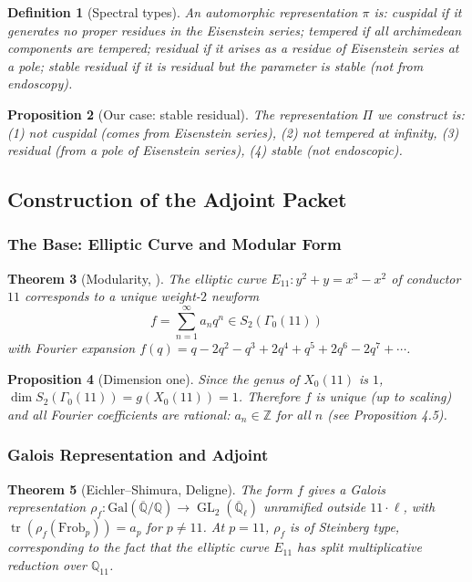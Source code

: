 \documentclass[12pt]{amsart}
\newtheorem{theorem}{Theorem}[section]
\newtheorem{proposition}[theorem]{Proposition}
\newtheorem{definition}[theorem]{Definition}
\theoremstyle{definition}
\DeclareMathOperator\GL{GL}
\DeclareMathOperator\tr{tr}
\newcommand{\Q}{\mathbb{Q}}
\newcommand{\Z}{\mathbb{Z}}
\newcommand{\Frob}{\mathrm{Frob}}
\newcommand{\Gal}{\mathrm{Gal}}
\begin{document}
\begin{definition}[Spectral types]
An automorphic representation $\pi$ is: \emph{cuspidal} if it generates no proper residues in the Eisenstein series; \emph{tempered} if all archimedean components are tempered; \emph{residual} if it arises as a residue of Eisenstein series at a pole; \emph{stable residual} if it is residual but the parameter is stable (not from endoscopy).
\end{definition}

\begin{proposition}[Our case: stable residual]
The representation $\Pi$ we construct is: (1) not cuspidal (comes from Eisenstein series), (2) not tempered at infinity, (3) residual (from a pole of Eisenstein series), (4) stable (not endoscopic).
\end{proposition}

\subsection{Construction of the Adjoint Packet}

\subsubsection{The Base: Elliptic Curve and Modular Form}

\begin{theorem}[Modularity, \cite{Wiles-Taylor}]
The elliptic curve $E_{11}: y^2 + y = x^3 - x^2$ of conductor $11$ corresponds to a unique weight-$2$ newform
\[
f = \sum_{n=1}^{\infty} a_n q^n \in S_2(\Gamma_0(11))
\]
with Fourier expansion $f(q) = q - 2q^2 - q^3 + 2q^4 + q^5 + 2q^6 - 2q^7 + \cdots$.
\end{theorem}

\begin{proposition}[Dimension one]
Since the genus of $X_0(11)$ is $1$, $\dim S_2(\Gamma_0(11)) = g(X_0(11)) = 1$. Therefore $f$ is unique (up to scaling) and all Fourier coefficients are rational: $a_n \in \Z$ for all $n$ (see Proposition 4.5).
\end{proposition}

\subsubsection{Galois Representation and Adjoint}

\begin{theorem}[Eichler--Shimura, Deligne]
The form $f$ gives a Galois representation $\rho_f \colon \Gal(\overline{\Q}/\Q) \to \GL_2(\overline{\Q}_{\ell})$ unramified outside $11 \cdot \ell$, with $\tr(\rho_f(\Frob_p)) = a_p$ for $p \neq 11$. At $p = 11$, $\rho_f$ is of Steinberg type, corresponding to the fact that the elliptic curve $E_{11}$ has split multiplicative reduction over $\mathbb{Q}_{11}$.
\end{theorem}
\end{document}
